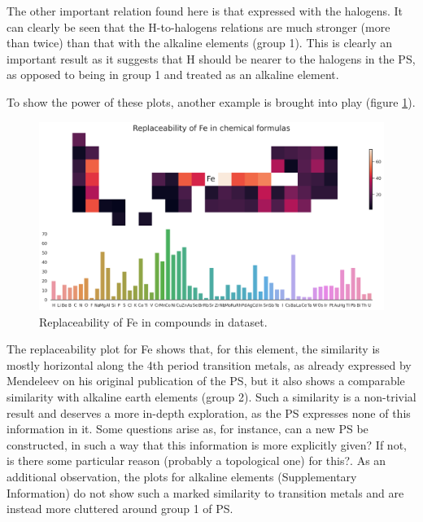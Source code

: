 \documentclass[]{article}
\begin{document}
The other important relation found here is that expressed with the halogens. It can clearly be seen that the H-to-halogens relations are much stronger (more than twice) than that with the alkaline elements (group 1). This is clearly an important result as it suggests that H should be nearer to the halogens in the PS, as opposed to being in group 1 and treated as an alkaline element.

To show the power of these plots, another example is brought into play (figure \ref{fig:fig4}).

\begin{figure}[h!]
  \centering
	\includegraphics[width=13.0cm]{replace_Fe.png}
	\caption{Replaceability of Fe in compounds in dataset.}
	\label{fig:fig4}
\end{figure}

The replaceability plot for Fe shows that, for this element, the similarity is mostly horizontal along the 4th period transition metals, as already expressed by Mendeleev on his original publication of the PS, but it also shows a comparable similarity with alkaline earth elements (group 2). Such a similarity is a non-trivial result and deserves a more in-depth exploration, as the PS expresses none of this information in it. Some questions arise as, for instance, can a new PS be constructed, in such a way that this information is more explicitly given? If not, is there some particular reason (probably a topological one) for this?. As an additional observation, the plots for alkaline elements (Supplementary Information) do not show such a marked similarity to transition metals and are instead more cluttered around group 1 of PS.
\end{document}
